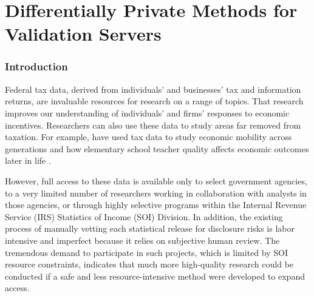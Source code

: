 
\fancyfoot{}



\part{Differentially Private Methods for Validation Servers}

\section{Introduction}\label{sec:intro}

Federal tax data, derived from individuals' and businesses' tax and information returns, are invaluable resources for research on a range of topics. That research improves our understanding of individuals' and firms' responses to economic incentives. Researchers can also use these data to study areas far removed from taxation. For example, \citet{chetty2014measuring} have used tax data to study economic mobility across generations and how elementary school teacher quality affects economic outcomes later in life \citep{chetty2011does}.

However, full access to these data is available only to select government agencies, to a very limited number of researchers working in collaboration with analysts in those agencies, or through highly selective programs within the Internal Revenue Service (IRS) Statistics of Income (SOI) Division. In addition, the existing process of manually vetting each statistical release for disclosure risks is labor intensive and imperfect because it relies on subjective human review. The tremendous demand to participate in such projects, which is limited by SOI resource constraints, indicates that much more high-quality research could be conducted if a safe and less resource-intensive method were developed to expand access.

